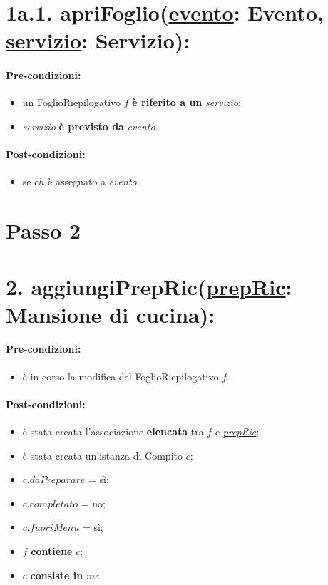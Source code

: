 \section*{1a.1. apriFoglio(\underline{evento}: Evento, \underline{servizio}: Servizio):}

\paragraph{Pre-condizioni:}

\begin{itemize}
  \item un FoglioRiepilogativo $f$ \textbf{è riferito a un} \textit{servizio};
  \item \textit{servizio} \textbf{è previsto da} \textit{evento}.
\end{itemize}

\paragraph{Post-condizioni:}

\begin{itemize}
  \item se $ch$ è assegnato a \textit{evento}.
\end{itemize}

\section{Passo 2}

\section*{2. aggiungiPrepRic(\underline{prepRic}: Mansione di cucina):}

\paragraph{Pre-condizioni:}

\begin{itemize}
  \item è in corso la modifica del FoglioRiepilogativo $f$.
\end{itemize}

\paragraph{Post-condizioni:}

\begin{itemize}
  \item è stata creata l'associazione \textbf{elencata} tra $f$ e \underline{\textit{prepRic}};
  \item è stata creata un'istanza di Compito $c$;
  \item $c.daPreparare$ = sì;
  \item $c.completato$ = no;
  \item $c.fuoriMenu$ = sì;
  \item $f$ \textbf{contiene} $c$;
  \item $c$ \textbf{consiste in} $mc$.
\end{itemize}

